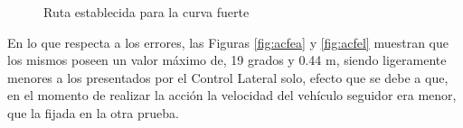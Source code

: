 \begin{figure}[H]
 \centering
 \caption{Ruta establecida para la curva fuerte}
 \label{fig:rec}
\end{figure}

\par En lo que respecta a los errores, las Figuras \ref{fig:acfea} y \ref{fig:acfel} muestran que los mismos poseen un valor máximo de, 19 grados y 0.44 m, siendo ligeramente menores a los presentados por el Control Lateral solo, efecto que se debe a que, en el momento de realizar la acción la velocidad del vehículo seguidor era menor, que la fijada en la otra prueba.\\ 
 

